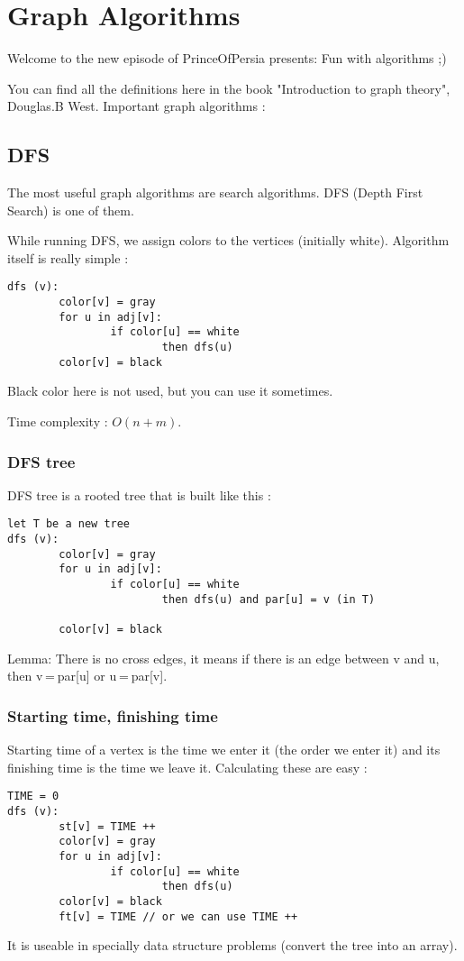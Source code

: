 \section{Graph Algorithms}


Welcome to the new episode of PrinceOfPersia presents: Fun with algorithms ;)

You can find all the definitions here in the book "Introduction to graph theory", Douglas.B West. Important graph algorithms :
\subsection{DFS}
The most useful graph algorithms are search algorithms. DFS (Depth First Search) is one of them.

While running DFS, we assign colors to the vertices (initially white). Algorithm itself is really simple :
\begin{verbatim}
dfs (v):
        color[v] = gray
        for u in adj[v]:
                if color[u] == white
                        then dfs(u)
        color[v] = black
\end{verbatim}
Black color here is not used, but you can use it sometimes.

Time complexity : $O(n + m)$.
\subsubsection{DFS tree}
DFS tree is a rooted tree that is built like this :

\begin{verbatim}
let T be a new tree
dfs (v):
        color[v] = gray
        for u in adj[v]:
                if color[u] == white
                        then dfs(u) and par[u] = v (in T)

        color[v] = black
\end{verbatim}
Lemma: There is no cross edges, it means if there is an edge between v and u, then v = par[u] or u = par[v].
\subsubsection{Starting time, finishing time}
Starting time of a vertex is the time we enter it (the order we enter it) and its finishing time is the time we leave it. Calculating these are easy :
\begin{verbatim}
TIME = 0
dfs (v):
        st[v] = TIME ++
        color[v] = gray
        for u in adj[v]:
                if color[u] == white
                        then dfs(u)
        color[v] = black
        ft[v] = TIME // or we can use TIME ++
\end{verbatim}
It is useable in specially data structure problems (convert the tree into an array).

